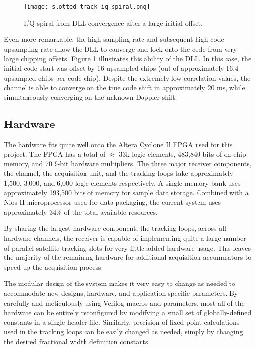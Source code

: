 \documentclass[12pt]{article}
\begin{document}
\begin{figure}
\centering
\texttt{[image: slotted\_track\_iq\_spiral.png]}
\caption{I/Q spiral from DLL convergence after a large initial offset.}
\label{img:iq spiral}
\end{figure}

Even more remarkable, the high sampling rate and subsequent high code upsampling rate allow the DLL to converge and lock onto the code from very large chipping offsets. Figure \ref{img:iq spiral} illustrates this ability of the DLL. In this case, the initial code start was offset by 16 upsampled chips (out of approximately 16.4 upsampled chips per code chip). Despite the extremely low correlation values, the channel is able to converge on the true code shift in approximately 20 ms, while simultaneously converging on the unknown Doppler shift.

\subsection{Hardware}
The hardware fits quite well onto the Altera Cyclone II FPGA used for this project. The FPGA has a total of $\approx$ 33k logic elements, 483,840 bits of on-chip memory, and 70 9-bit hardware multipliers. The three major receiver components, the channel, the acquisition unit, and the tracking loops take approximately 1,500, 3,000, and 6,000 logic elements respectively. A single memory bank uses approximately 193,500 bits of memory for sample data storage. Combined with a Nios II microprocessor used for data packaging, the current system uses approximately 34\% of the total available resources.

By sharing the largest hardware component, the tracking loops, across all hardware channels, the receiver is capable of implementing quite a large number of parallel satellite tracking slots for very little added hardware usage. This leaves the majority of the remaining hardware for additional acquisition accumulators to speed up the acquisition process.

The modular design of the system makes it very easy to change as needed to accommodate new designs, hardware, and application-specific parameters. By carefully and meticulously using Verilog macros and parameters, most all of the hardware can be entirely reconfigured by modifying a small set of globally-defined constants in a single header file. Similarly, precision of fixed-point calculations used in the tracking loops can be easily changed as needed, simply by changing the desired fractional width definition constants.
\end{document}

